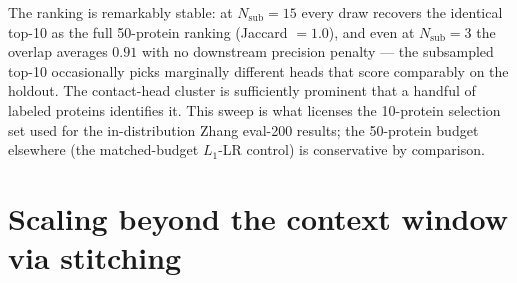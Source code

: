 \documentclass{article}
\begin{document}
The ranking is remarkably stable: at $N_{\mathrm{sub}}{=}15$ every draw
recovers the identical top-10 as the full 50-protein ranking (Jaccard
$= 1.0$), and even at $N_{\mathrm{sub}}{=}3$ the overlap averages
$0.91$ with no downstream precision penalty --- the subsampled
top-10 occasionally picks marginally different heads that score
comparably on the holdout. The contact-head cluster is sufficiently
prominent that a handful of labeled proteins identifies it. This sweep
is what licenses the 10-protein selection set used for the in-distribution
Zhang eval-200 results; the 50-protein budget elsewhere (the matched-budget
$L_1$-LR control) is conservative by comparison.

\section{Scaling beyond the context window via stitching}
\label{app:stitch}
\end{document}
